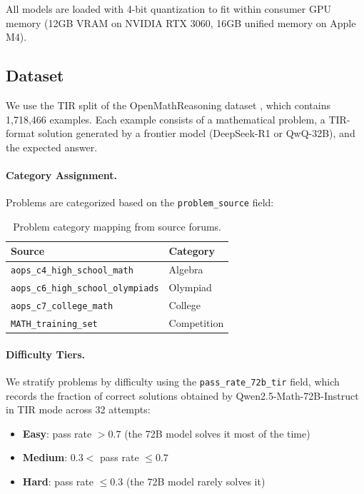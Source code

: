 \documentclass[11pt,a4paper]{article}
\begin{document}
All models are loaded with 4-bit quantization to fit within consumer GPU memory
(12GB VRAM on NVIDIA RTX 3060, 16GB unified memory on Apple M4).

\subsection{Dataset}

We use the TIR split of the OpenMathReasoning dataset
\citep{nvidia2025openmath}, which contains 1,718,466 examples. Each example
consists of a mathematical problem, a TIR-format solution generated by a
frontier model (DeepSeek-R1 or QwQ-32B), and the expected answer.

\paragraph{Category Assignment.}
Problems are categorized based on the \texttt{problem\_source} field:

\begin{table}[h]
\centering
\caption{Problem category mapping from source forums.}
\label{tab:categories}
\begin{tabular}{ll}
\toprule
\textbf{Source} & \textbf{Category} \\
\midrule
\texttt{aops\_c4\_high\_school\_math} & Algebra \\
\texttt{aops\_c6\_high\_school\_olympiads} & Olympiad \\
\texttt{aops\_c7\_college\_math} & College \\
\texttt{MATH\_training\_set} & Competition \\
\bottomrule
\end{tabular}
\end{table}

\paragraph{Difficulty Tiers.}
We stratify problems by difficulty using the \texttt{pass\_rate\_72b\_tir}
field, which records the fraction of correct solutions obtained by
Qwen2.5-Math-72B-Instruct in TIR mode across 32 attempts:

\begin{itemize}[nosep]
    \item \textbf{Easy}: pass rate $> 0.7$ (the 72B model solves it most of the time)
    \item \textbf{Medium}: $0.3 <$ pass rate $\leq 0.7$
    \item \textbf{Hard}: pass rate $\leq 0.3$ (the 72B model rarely solves it)
\end{itemize}
\end{document}
